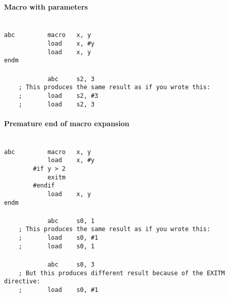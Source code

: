         \paragraph{Macro with parameters}
        ~\\
        \verb'abc         macro   x, y'\\
        \verb'            load    x, #y'\\
        \verb'            load    x, y'\\
        \verb'endm'\\
        \verb''\\
        \verb'            abc     s2, 3'\\
        \verb'    ; This produces the same result as if you wrote this:'\\
        \verb'    ;       load    s2, #3'\\
        \verb'    ;       load    s2, 3'

        \paragraph{Premature end of macro expansion}
        ~\\
        \verb'abc         macro   x, y'\\
        \verb'            load    x, #y'\\
        \verb'        #if y > 2'\\
        \verb'            exitm'\\
        \verb'        #endif'\\
        \verb'            load    x, y'\\
        \verb'endm'\\
        \verb''\\
        \verb'            abc     s0, 1'\\
        \verb'    ; This produces the same result as if you wrote this:'\\
        \verb'    ;       load    s0, #1'\\
        \verb'    ;       load    s0, 1'\\
        \verb''\\
        \verb'            abc     s0, 3'\\
        \verb'    ; But this produces different result because of the EXITM directive:'\\
        \verb'    ;       load    s0, #1'\\

